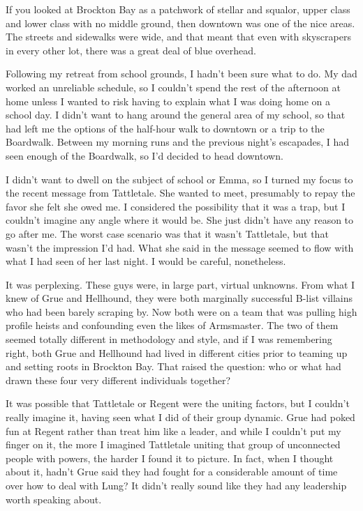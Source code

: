 





If you looked at Brockton Bay as a patchwork of stellar and squalor, upper class and lower class with no middle ground, then downtown was one of the nice areas.  The streets and sidewalks were wide, and that meant that even with skyscrapers in every other lot, there was a great deal of blue overhead.



Following my retreat from school grounds, I hadn't been sure what to do.  My dad worked an unreliable schedule, so I couldn't spend the rest of the afternoon at home unless I wanted to risk having to explain what I was doing home on a school day.  I didn't want to hang around the general area of my school, so that had left me the options of the half-hour walk to downtown or a trip to the Boardwalk.  Between my morning runs and the previous night's escapades, I had seen enough of the Boardwalk, so I'd decided to head downtown.



I didn't want to dwell on the subject of school or Emma, so I turned my focus to the recent message from Tattletale.  She wanted to meet, presumably to repay the favor she felt she owed me.  I considered the possibility that it was a trap, but I couldn't imagine any angle where it would be.  She just didn't have any reason to go after me.  The worst case scenario was that it wasn't Tattletale, but that wasn't the impression I'd had.  What she said in the message seemed to flow with what I had seen of her last night.  I would be careful, nonetheless.



It was perplexing.  These guys were, in large part, virtual unknowns.  From what I knew of Grue and Hellhound, they were both marginally successful B-list villains who had been barely scraping by.  Now both were on a team that was pulling high profile heists and confounding even the likes of Armsmaster.  The two of them seemed totally different in methodology and style, and if I was remembering right, both Grue and Hellhound had lived in different cities prior to teaming up and setting roots in Brockton Bay.  That raised the question: who or what had drawn these four very different individuals together?



It was possible that Tattletale or Regent were the uniting factors, but I couldn't really imagine it, having seen what I did of their group dynamic.  Grue had poked fun at Regent rather than treat him like a leader, and while I couldn't put my finger on it,  the more I imagined Tattletale uniting that group of unconnected people with powers, the harder I found it to picture.  In fact, when I thought about it, hadn't Grue said they had fought for a considerable amount of time over how to deal with Lung?  It didn't really sound like they had any leadership worth speaking about.



